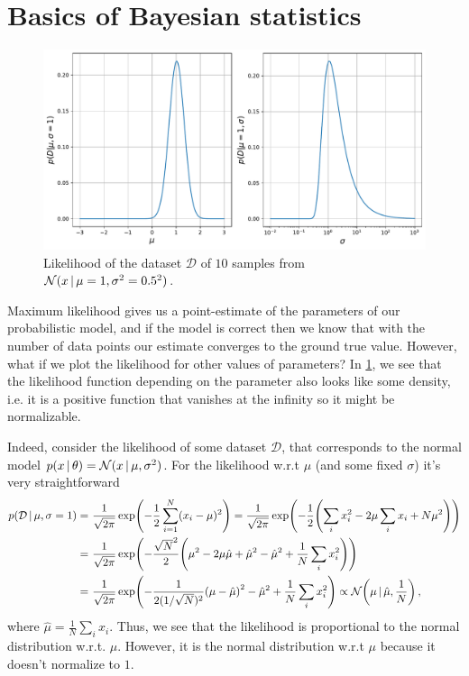 \section{Basics of Bayesian statistics}

\begin{figure}[h]
    \centering
    \includegraphics[width=0.9\linewidth]{pics/likelihood.pdf}
    \caption{Likelihood of the dataset $\mathcal{D}$ of $10$ samples from $\mathcal{N}(x\,|\, \mu = 1, \sigma^2 = 0.5^2)$.}
    \label{fig:likelihood}
\end{figure}

Maximum likelihood gives us a point-estimate of the parameters of our probabilistic model, and if the model is correct  then we know that with the number of data points our estimate converges to the ground true value.
However, what if we plot the likelihood for other values of parameters?
In \cref{fig:likelihood}, we see that the likelihood function depending on the parameter also looks like some density, i.e. it is a positive function that vanishes at the infinity so it might be normalizable.

Indeed, consider the likelihood of some dataset $\mathcal{D}$, that corresponds to the normal model $p(x\,|\, \theta) = \mathcal{N}(x\,|\, \mu, \sigma^2)$. 
For the likelihood w.r.t $\mu$ (and some fixed $\sigma$) it's very straightforward
\begin{align}
    p(\mathcal{D}\cond \mu, \sigma=1) =~& \frac{1}{\sqrt{2\pi}}\exp\left(-\frac{1}{2}\sum_{i=1}^N(x_i-\mu)^2\right) = \frac{1}{\sqrt{2\pi}}\exp\left(-\frac{1}{2}\left(\sum_ix_i^2-2\mu\sum_i x_i + N\mu^2\right)\right)\\
    =~&\frac{1}{\sqrt{2\pi}}\exp\left(-\frac{\sqrt{N}^2}{2}\left(\mu^2-2\mu\hat{\mu} + \hat{\mu}^2 - \hat{\mu}^2 + \frac{1}{N}\sum_i x_i^2\right) \right)\\
    =~&\frac{1}{\sqrt{2\pi}}\exp\left(-\frac{1}{2(1/\sqrt{N})^2}\left(\mu-\hat{\mu}\right)^2 - \hat{\mu}^2 + \frac{1}{N}\sum_i x_i^2\right)\propto\Normal\left(\mu\cond \hat{\mu},\frac{1}{N}\right)\,,
    \label{eq:normal_likelihood}
\end{align}
where $\hat{\mu} = \frac{1}{N}\sum_i x_i$.
Thus, we see that the likelihood is proportional to the normal distribution w.r.t. $\mu$. 
However, it is the normal distribution w.r.t $\mu$ because it doesn't normalize to $1$. 

